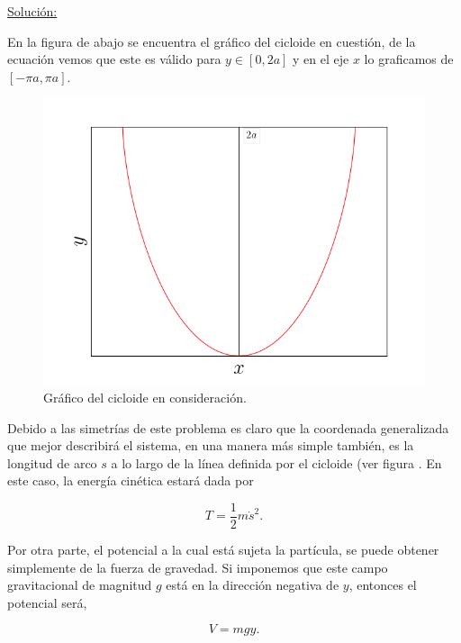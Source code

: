 \documentclass[a4paper,10pt]{article}
\numberwithin{equation}{section}
\begin{document}
\vspace{.3cm}

\underline{Solución:} \vspace{.3cm}

En la figura de abajo se encuentra el gráfico del cicloide en cuestión, de la ecuación 
vemos que este es válido para $y \in [0,2a]$ y en el eje $x$ lo graficamos de $[-\pi a, \pi a]$.

\begin{figure}[H]
 \center
 \includegraphics[scale=0.4]{problema5fig1}
 \caption{Gráfico del cicloide en consideración.}
 \label{fig:problema5fig1}
\end{figure}

Debido a las simetrías de este problema es claro que la coordenada generalizada que 
mejor describirá el sistema, en una manera más simple también, es la longitud de 
arco $s$ a lo largo de la línea definida por el cicloide (ver figura . 
En este caso, la energía cinética estará dada por 

\begin{equation}
 T = \frac{1}{2} m \dot{s}^2.
 \label{eq:energCinetCiclo1}
\end{equation}

Por otra parte, el potencial a la cual está sujeta la partícula, se puede obtener
simplemente de la fuerza de gravedad. Si imponemos que este campo gravitacional de 
magnitud $g$ está en la dirección negativa de $y$, entonces el potencial será,

\begin{equation}
 V = mgy.
 \label{eq:energPotenCiclo1}
\end{equation}
\end{document}
